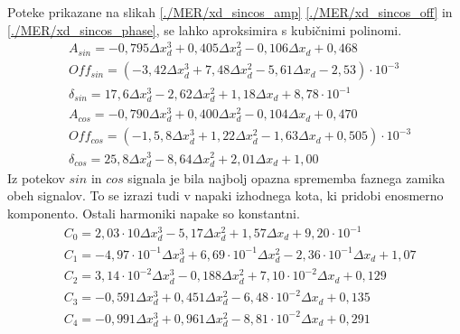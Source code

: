 Poteke prikazane na slikah \ref{./MER/xd_sincos_amp} \ref{./MER/xd_sincos_off} in \ref{./MER/xd_sincos_phase}, se lahko aproksimira s kubičnimi polinomi.
\begin{eqnarray}
&A_{sin}=-0,795\Delta x_d^3+0,405\Delta x_d^2-0,106\Delta x_d+0,468\\
&Off_{sin}=(-3,42\Delta x_d^3+7,48\Delta x_d^2-5,61\Delta x_d-2,53) \cdot 10^{-3}\\
&\delta_{sin}=17,6\Delta x_d^3-2,62\Delta x_d^2+1,18\Delta x_d+8,78\cdot10^{-1}\\
&A_{cos}=-0,790\Delta x_d^3+0,400\Delta x_d^2-0,104\Delta x_d+0,470\\
&Off_{cos}=(-1,5,8\Delta x_d^3+1,22\Delta x_d^2-1,63\Delta x_d+0,505) \cdot 10^{-3}\\
&\delta_{cos}=25,8\Delta x_d^3-8,64\Delta x_d^2+2,01\Delta x_d+1,00
\end{eqnarray}
Iz potekov $sin$ in $cos$ signala je bila najbolj opazna sprememba faznega zamika obeh signalov. To se izrazi tudi v napaki izhodnega kota, ki pridobi enosmerno komponento. Ostali harmoniki napake so konstantni.
\begin{eqnarray}
&C_0 =2,03\cdot 10\Delta x_d^{3}-5,17\Delta x_d^{2}+1,57\Delta x_d+9,20\cdot 10^{-1} \\                                
&C_1 =-4,97\cdot 10^{-1}\Delta x_d^{3}+6,69\cdot 10^{-1}\Delta x_d^{2}-2,36\cdot 10^{-1}\Delta x_d+1,07 \\             
&C_2 =3,14\cdot 10^{-2}\Delta x_d^{3}-0,188\Delta x_d^{2}+7,10\cdot 10^{-2}\Delta x_d+0,129 \\ 
&C_3 =-0,591\Delta x_d^{3}+0,451\Delta x_d^{2}-6,48\cdot 10^{-2}\Delta x_d+0,135\\
&C_4 =-0,991\Delta x_d^{3}+0,961\Delta x_d^{2}-8,81\cdot 10^{-2}\Delta x_d+0,291
\end{eqnarray}




